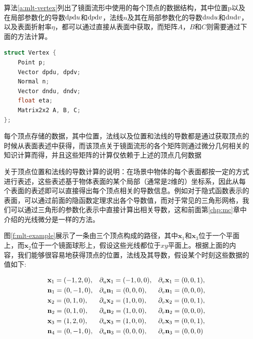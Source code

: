 算法\ref{a:mlt-vertex}列出了镜面流形中使用的每个顶点的数据结构，其中位置p以及在局部参数化的导数${\rm d}p{\rm d}u$和${\rm d}p{\rm d}v$，法线$n$及其在局部参数化的导数${\rm d}n{\rm d}u$和${\rm d}n{\rm d}v$，以及表面折射率$\eta$，都可以通过直接从表面中获取，而矩阵$A$，$B$和$C$则需要通过下面的方法计算。

\begin{algorithm}
\begin{lstlisting}[language=C++, mathescape]
struct Vertex { 
	Point p;
	Vector dpdu, dpdv; 
	Normal n;
	Vector dndu, dndv; 
	float eta; 
	Matrix2x2 A, B, C;
};
\end{lstlisting}
\caption{每个顶点存储的数据，其中位置，法线以及位置和法线的导数都是通过获取顶点的时候从表面表述中获得，而该顶点关于镜面流形的各个矩阵则通过微分几何相关的知识计算而得，并且这些矩阵的计算仅依赖于上述的顶点几何数据}
\label{a:mlt-vertex}
\end{algorithm}

\begin{myshaded}
	关于顶点位置和法线的导数计算的说明：在场景中物体的每个表面都按一定的方式进行表述，这些表述基于物体表面的某个局部（通常是2维的）坐标系，因此从每个表面的表述即可以直接得出每个顶点相关的导数信息。例如对于隐式函数表示的表面，可以通过前面的隐函数定理求出各个导数值，而对于常见的三角形网格，我们可以通过三角形的参数化表示中直接计算出相关导数，这和前面第\ref{chp:mc}章中介绍的光线微分是一样的方法。
\end{myshaded}

图\ref{f:mlt-example}展示了一条由三个顶点构成的路径，其中$\mathbf{x}_1$和$\mathbf{x}_3$位于一个平面上，而$\mathbf{x}_2$位于一个镜面球形上，假设这些光线都位于$xy$平面上。根据上面的内容，我们能够很容易地获得顶点的位置，法线及其导数，假设某个时刻这些数据的值如下:

\begin{equation}
\begin{aligned}
	&\mathbf{x}_1=(-1,2,0), &&{\rm \partial}_u\mathbf{x}_1=(-1,0,0), &&{\rm \partial}_v\mathbf{x}_1=(0,0,1),\\
	&\mathbf{n}_1=(0,-1,0), &&{\rm \partial}_u\mathbf{n}_1=(0,0,0),  &&{\rm \partial}_v\mathbf{n}_1=(0,0,0),\\
	&\mathbf{x}_2=(0,1,0),  &&{\rm \partial}_u\mathbf{x}_2=(1,0,0),  &&{\rm \partial}_v\mathbf{x}_2=(0,0,1),\\
	&\mathbf{n}_2=(0,1,0),  &&{\rm \partial}_u\mathbf{n}_2=(1,0,0),  &&{\rm \partial}_v\mathbf{n}_2=(0,0,0),\\
	&\mathbf{x}_3=(1,2,0),  &&{\rm \partial}_u\mathbf{x}_3=(1,0,0),  &&{\rm \partial}_v\mathbf{x}_3=(0,0,1),\\
	&\mathbf{n}_4=(0,-1,0), &&{\rm \partial}_u\mathbf{n}_3=(0,0,0),  &&{\rm \partial}_v\mathbf{n}_3=(0,0,0)
\end{aligned}
\end{equation}

